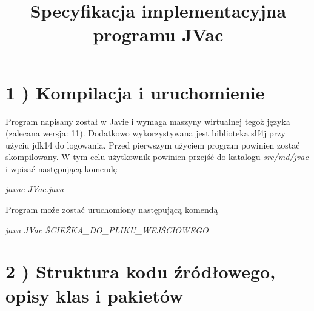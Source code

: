 \documentclass[]{article}
\title{Specyfikacja implementacyjna programu JVac}
\date{}
\begin{document}
    \maketitle

    \section{1 ) Kompilacja i uruchomienie}

    Program napisany został w Javie i wymaga maszyny wirtualnej tegoż języka
    (zalecana wersja: 11). Dodatkowo wykorzystywana jest biblioteka slf4j
    przy użyciu jdk14 do logowania. Przed pierwszym użyciem program powinien
    zostać skompilowany. W tym celu użytkownik powinien przejść do katalogu
    \emph{src/md/jvac} i wpisać następującą komendę

    \begin{center}
        \emph{javac JVac.java}
    \end{center}

    Program może zostać uruchomiony następującą komendą

    \begin{center}
        \emph{java JVac ŚCIEŻKA\_DO\_PLIKU\_WEJŚCIOWEGO}
    \end{center}


    \section{2 ) Struktura kodu źródłowego, opisy klas i pakietów}
\end{document}
